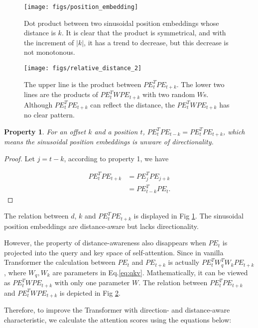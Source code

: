 \documentclass[11pt,a4paper]{article}
\newtheorem{prop}{Property}
\begin{document}
\begin{figure}[t]
    \centering
    \texttt{[image: figs/position\_embedding]}
    \caption{Dot product between two sinusoidal position embeddings whose distance is $k$. It is clear that the product is symmetrical, and with the increment of $|k|$, it has a trend to decrease, but this decrease is not monotonous. }\label{fig:position_curve}
\end{figure}

\begin{figure}[t]
    \centering
    \texttt{[image: figs/relative\_distance\_2]}
    \caption{The upper line is the product between $PE_t^T PE_{t+k}$. The lower two lines are the products of $PE_t^T W PE_{t+k}$ with two random $W$s. Although $PE_t^TPE_{t+k}$ can reflect the distance, the $PE_t^TWPE_{t+k}$ has no clear pattern. }\label{fig:position_curve_2}
\end{figure}

\begin{prop}
For an offset $k$ and a position $t$, $PE_{t}^TPE_{t-k}=PE_{t}^TPE_{t+k}$, which means the sinusoidal position embeddings is unware of directionality.
\end{prop}
\begin{proof}

Let $j=t-k$, according to property 1, we have

\vspace{-1em}
{\small
\begin{align}
 PE_{t}^TPE_{t+k} &= PE_{j}^TPE_{j+k}\\
 &=PE_{t-k}^TPE_{t}.
\end{align}
}\end{proof}

The relation between $d$, $k$ and $PE_t^TPE_{t+k}$ is displayed in Fig \ref{fig:position_curve}. The sinusoidal position embeddings are distance-aware but lacks directionality.

However, the property of distance-awareness also disappears when $PE_t$ is projected into the query and key space of self-attention. Since in vanilla Transformer the calculation between $PE_t$ and $PE_{t+k}$ is actually $PE_t^TW_q^TW_kPE_{t+k}$, where $W_q, W_k$ are parameters in Eq.\eqref{eq:qkv}. Mathematically, it can be viewed as $PE_t^TWPE_{t+k}$ with only one parameter $W$. The relation between $PE_t^TPE_{t+k}$ and $PE_t^TWPE_{t+k}$ is depicted in Fig \ref{fig:position_curve_2}.


Therefore, to improve the Transformer with direction- and distance-aware characteristic, we calculate the attention scores using the equations below:
\end{document}
